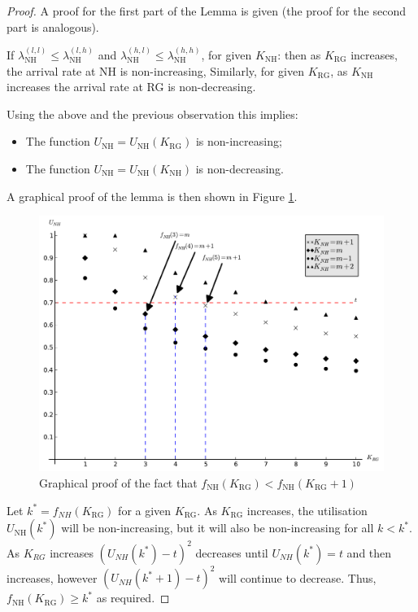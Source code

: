 \documentclass{article}
\newcommand{\NH}{\text{NH}}
\newcommand{\RG}{\text{RG}}
\begin{document}
\begin{proof}

A proof for the first part of the Lemma is given (the proof for the second part is analogous).

If $\lambda_{\NH}^{(l,l)}\leq \lambda_{\NH}^{(l,h)}$ and $\lambda_{\NH}^{(h,l)}\leq \lambda_{\NH}^{(h,h)}$, for given $K_{\NH}$: then as $K_{\RG}$ increases, the arrival rate at NH is non-increasing,
Similarly, for given $K_{{\RG}}$, as $K_{\NH}$ increases the arrival rate at RG is non-decreasing.

Using the above and the previous observation this implies:

\begin{itemize}
    \item The function $U_{\NH}=U_{\NH}(K_{\RG})$ is non-increasing;
    \item The function $U_{\NH}=U_{\NH}(K_{\NH})$ is non-decreasing.
\end{itemize}

A graphical proof of the lemma is then shown in Figure \ref{proof}.

\begin{figure}[!hbtp]
\begin{center}
\includegraphics[width=.7\textwidth]{./Images/proof.pdf}
\end{center}
\caption{Graphical proof of the fact that $f_{\NH}(K_{\RG})<f_{\NH}(K_{\RG}+1)$}\label{proof}
\end{figure}

Let $k^*=f_{NH}(K_{\RG})$ for a given $K_{\RG}$.
As $K_{\RG}$ increases, the utilisation $U_{\NH}(k^*)$ will be non-increasing, but it will also be non-increasing for all $k<k^*$.
As $K_{RG}$ increases $\left(U_{NH}(k^*)-t\right)^2$ decreases until $U_{NH}(k^*)=t$ and then increases, however $\left(U_{NH}(k^*+1)-t\right)^2$ will continue to decrease.
Thus, $f_{\NH}(K_{\RG})\geq k^*$ as required.
\end{proof}
\end{document}
